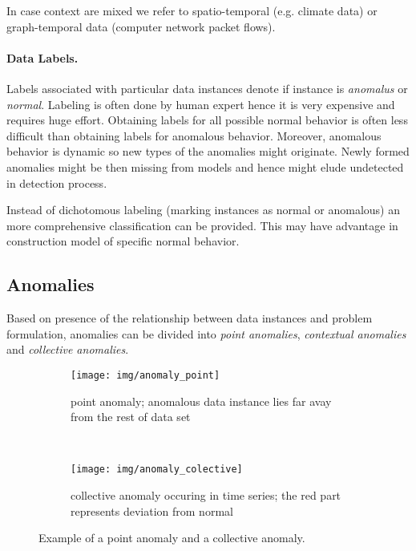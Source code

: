 In case context are mixed we refer to spatio-temporal (e.g. climate data) or 
graph-temporal data (computer network packet flows).

\paragraph*{Data Labels.}

Labels associated with particular data instances denote if instance is \emph{anomalus}
or \emph{normal}. Labeling is often done by human expert hence it is very expensive and requires
huge effort. Obtaining labels for all possible normal behavior is often less difficult
than obtaining labels for anomalous behavior. Moreover, anomalous behavior is dynamic so
new types of the anomalies might originate. Newly formed anomalies might be then missing 
from models and hence might elude undetected in detection process. 

Instead of dichotomous labeling (marking instances as normal or anomalous) an more comprehensive
classification can be provided. This may have advantage in construction model of specific normal behavior.

\subsection{Anomalies}

Based on presence of the relationship between data instances and problem formulation, anomalies
can be divided into \emph{point anomalies}, \emph{contextual anomalies} and \emph{collective anomalies}.

\begin{figure}[h]%
  \centering
        \begin{subfigure}[b]{0.5\textwidth}
                \centering
                \texttt{[image: img/anomaly\_point]}
                \caption{\small point anomaly; anomalous data instance lies far avay from the
                rest of data set}
                \label{fig:anomaly_point}
        \end{subfigure}%
        ~ \begin{subfigure}[b]{0.5\textwidth}
                \centering
                \texttt{[image: img/anomaly\_colective]} 
                \caption{\small collective anomaly occuring in time series; the red part represents deviation from normal}
                \label{fig:anomaly_collective}
        \end{subfigure}%
  \caption{\small Example of a point anomaly and a collective anomaly. }
  \label{fig:anomaly}
\end{figure}

